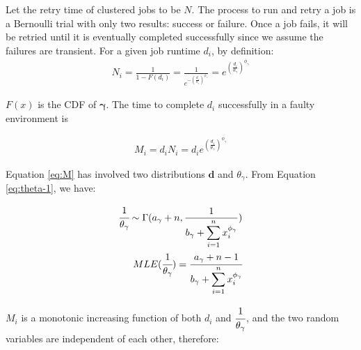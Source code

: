 \documentclass{IOS-Book-Article}
\begin{document}

Let the retry time of clustered jobs to be $N$. The process to run and retry a job is a Bernoulli trial with only two results: success or failure. Once a job fails, it will be retried until it is eventually completed successfully since we assume the failures are transient. For a given job runtime $d_i$, by definition:
\begin{eqnarray}
\displaystyle
N_i=\frac{1}{1-F(d_i)}=\frac{1}{e^{-(\displaystyle\frac{d_i}{\theta_{\gamma}})^{\phi_{\gamma}}}}=e^{(\displaystyle\frac{d_i}{\theta_{\gamma}})^{\phi_{\gamma}}} 
\label{eq:N}
\end{eqnarray}

$F(x)$ is the CDF of $\bm\gamma$. The time to complete $d_i$ successfully in a faulty environment is

\begin{eqnarray}
\displaystyle
M_i=d_iN_i=d_ie^{(\displaystyle\frac{d_i}{\theta_{\gamma}})^{\phi_{\gamma}}} 
\label{eq:M}
\end{eqnarray}

Equation \ref{eq:M} has involved two distributions $\bm d$ and $\theta_{\gamma}$. From Equation \ref{eq:theta-1}, we have:

\begin{eqnarray}
\displaystyle\cfrac{1}{\theta_{\gamma}}\sim\Gamma(a_{\gamma}+n,\frac{1}{\displaystyle b_{\gamma}+\sum_{i=1}^n{x_i^{\phi_{\gamma}}}}) \\
MLE(\displaystyle\cfrac{1}{\theta_{\gamma}})=\displaystyle\cfrac{a_{\gamma}+n-1}{\displaystyle b_{\gamma}+\sum_{i=1}^n{x_i^{\phi_{\gamma}}}}
\label{eq:theta}
 \end{eqnarray}

$M_i$ is a monotonic increasing function of both $d_i$ and $\displaystyle\cfrac{1}{\theta_{\gamma}}$, and the two random variables are independent of each other, therefore:
\end{document}
